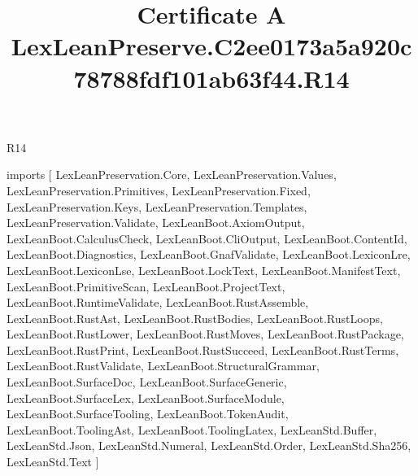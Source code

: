 \begin{lexlean}{R14}
\title{Certificate A LexLeanPreserve.C2ee0173a5a920c78788fdf101ab63f44.R14}
\begin{coremodule}
imports [
  LexLeanPreservation.Core,
  LexLeanPreservation.Values,
  LexLeanPreservation.Primitives,
  LexLeanPreservation.Fixed,
  LexLeanPreservation.Keys,
  LexLeanPreservation.Templates,
  LexLeanPreservation.Validate,
  LexLeanBoot.AxiomOutput,
  LexLeanBoot.CalculusCheck,
  LexLeanBoot.CliOutput,
  LexLeanBoot.ContentId,
  LexLeanBoot.Diagnostics,
  LexLeanBoot.GnafValidate,
  LexLeanBoot.LexiconLre,
  LexLeanBoot.LexiconLse,
  LexLeanBoot.LockText,
  LexLeanBoot.ManifestText,
  LexLeanBoot.PrimitiveScan,
  LexLeanBoot.ProjectText,
  LexLeanBoot.RuntimeValidate,
  LexLeanBoot.RustAssemble,
  LexLeanBoot.RustAst,
  LexLeanBoot.RustBodies,
  LexLeanBoot.RustLoops,
  LexLeanBoot.RustLower,
  LexLeanBoot.RustMoves,
  LexLeanBoot.RustPackage,
  LexLeanBoot.RustPrint,
  LexLeanBoot.RustSucceed,
  LexLeanBoot.RustTerms,
  LexLeanBoot.RustValidate,
  LexLeanBoot.StructuralGrammar,
  LexLeanBoot.SurfaceDoc,
  LexLeanBoot.SurfaceGeneric,
  LexLeanBoot.SurfaceLex,
  LexLeanBoot.SurfaceModule,
  LexLeanBoot.SurfaceTooling,
  LexLeanBoot.TokenAudit,
  LexLeanBoot.ToolingAst,
  LexLeanBoot.ToolingLatex,
  LexLeanStd.Buffer,
  LexLeanStd.Json,
  LexLeanStd.Numeral,
  LexLeanStd.Order,
  LexLeanStd.Sha256,
  LexLeanStd.Text
]


\end{coremodule}
\end{lexlean}
